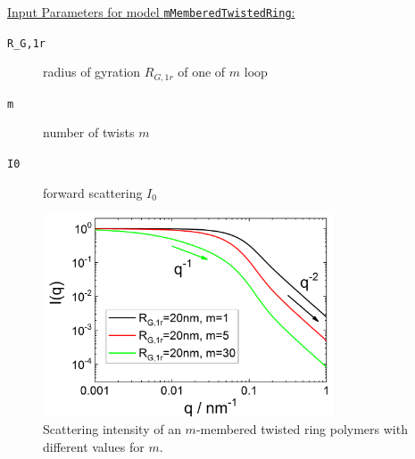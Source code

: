 \vspace{5mm}

\noindent
\underline{Input Parameters for model \texttt{mMemberedTwistedRing}:}
\begin{description}
\item[\texttt{R\_G,1r}] radius of gyration $R_{G,1r}$ of one of $m$ loop
\item[\texttt{m}]  number of twists $m$
\item[\texttt{I0}] forward scattering $I_0$
\end{description}

\begin{figure}[htb]
\begin{center}
\includegraphics[width=0.768\textwidth]{../images/form_factor/polymer_rings/mMemberedTwistedRing.png}
\end{center}
\caption{Scattering intensity of an $m$-membered twisted ring polymers with different values for $m$.} \label{fig:mMemberedTwistedRingIQ}
\end{figure}


\clearpage
